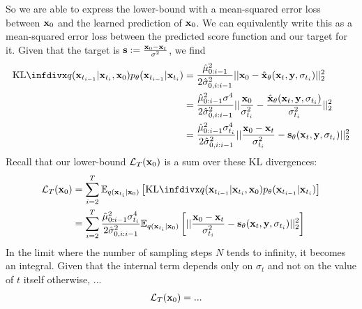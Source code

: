 So we are able to express the lower-bound with a mean-squared error loss between ${\mathbf{x}}_0$ and the learned prediction of ${\mathbf{x}}_0$. We can equivalently write this as a mean-squared error loss between the predicted score function and our target for it. Given that the target is ${\mathbf{s}} := \frac{{\mathbf{x}}_0 - {\mathbf{x}}_t}{\sigma^2}$, we find
\begin{align}
    \kl{q(\rvx_{t_{i-1}} | \rvx_{t_i}, \rvx_0)}{p_\theta(\rvx_{t_{i-1}} | \rvx_{t_i})} 
    &= \frac{\hat{\mu}_{0:i-1}^2}{2 \hat{\sigma}_{0,i:i-1}^2} || \rvx_0 - \hat{\rvx}_\theta(\rvx_t, \rvy, \sigma_{t_i}) ||_2^2 \\
    &= \frac{\hat{\mu}_{0:i-1}^2 \sigma^4}{2 \hat{\sigma}_{0,i:i-1}^2} || \frac{\rvx_0}{\sigma_{t_i}^2} - \frac{\hat{\rvx}_\theta(\rvx_t, \rvy, \sigma_{t_i})}{\sigma_{t_i}^2} ||_2^2 \\
    &= \frac{\hat{\mu}_{0:i-1}^2 \sigma_{t_i}^4}{2 \hat{\sigma}_{0,i:i-1}^2} || \frac{\rvx_0-\rvx_t}{\sigma_{t_i}^2} - \rvs_\theta(\rvx_t, \rvy, \sigma_{t_i}) ||_2^2
\end{align}
Recall that our lower-bound $\mathcal{L}_T({\mathbf{x}}_0)$ is a sum over these KL divergences:
\begin{align}
    \mathcal{L}_T(\rvx_0) &= \sum_{i=2}^T \EX_{q(\rvx_{t_i}|\rvx_0)} \left[ \kl{q(\rvx_{t_{i-1}} | \rvx_{t_i}, \rvx_0)}{p_\theta(\rvx_{t_{i-1}} | \rvx_{t_i})} \right] \\
    &= \sum_{i=2}^T \frac{\hat{\mu}_{0:i-1}^2 \sigma_{t_i}^4}{2 \hat{\sigma}_{0,i:i-1}^2} \EX_{q(\rvx_{t_i}|\rvx_0)} \left[  || \frac{\rvx_0-\rvx_t}{\sigma_{t_i}^2} - \rvs_\theta(\rvx_t, \rvy, \sigma_{t_i}) ||_2^2 \right]
\end{align}
In the limit where the number of sampling steps $N$ tends to infinity, it becomes an integral. Given that the internal term depends only on $\sigma_t$ and not on the value of $t$ itself otherwise, ...
\begin{align}
    \mathcal{L}_T({\mathbf{x}}_0) &= ...
\end{align}

